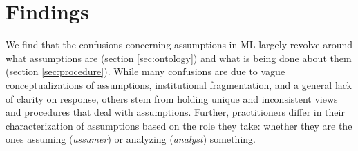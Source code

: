 \section{Findings}
\label{sec:findings}
We find that the confusions concerning assumptions in ML largely revolve around what assumptions are (section \ref{sec:ontology}) and what is being done about them (section \ref{sec:procedure}). While many confusions are due to vague conceptualizations of assumptions, institutional fragmentation, and a general lack of clarity on response, others stem from holding unique and inconsistent views and procedures that deal with assumptions. Further, practitioners differ in their characterization of assumptions based on the role they take: whether they are the ones assuming (\textit{assumer}) or analyzing (\textit{analyst}) something. 


